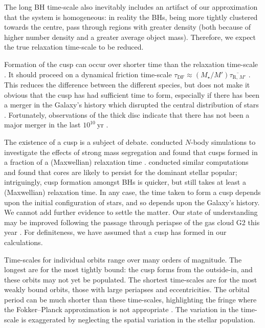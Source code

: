 \documentclass[useAMS,usedcolumn,usegraphicx,usenatbib]{mn2e}
\newcommand{\units}[1]{\ensuremath{~\mathrm{#1}}}
\newcommand{\sub}[1]{\ensuremath{_\mathrm{#1}}}
\begin{document}
\begin{onecolumn}
The long BH time-scale also inevitably includes an artifact of our approximation that the system is homogeneous: in reality the BHs, being more tightly clustered towards the centre, pass through regions with greater density (both because of higher number density and a greater average object mass). Therefore, we expect the true relaxation time-scale to be reduced. 

Formation of the cusp can occur over shorter time than the relaxation time-scale \citep{Bar-Or2012}. It should proceed on a dynamical friction time-scale $\tau\sub{DF} \approx (M_\star/M')\overline{\tau_{\mathrm{R},\,M'}}$ \citep[section 3.4]{Spitzer1987}. This reduces the difference between the different species, but does not make it obvious that the cusp has had sufficient time to form, especially if there has been a merger in the Galaxy's history which disrupted the central distribution of stars \citep{Gualandris2012}. Fortunately, observations of the thick disc indicate that there has not been a major merger in the last $10^{10}\units{yr}$ \citep{Wyse2008}.

The existence of a cusp is a subject of debate. \citet{Preto2010} conducted $N$-body simulations to investigate the effects of strong mass segregation \citep{Alexander2009, Keshet2009} and found that cusps formed in a fraction of a (Maxwellian) relaxation time \citep{Amaro-Seoane2011}. \citet{Gualandris2012} conducted similar computations and found that cores are likely to persist for the dominant stellar popular; intriguingly, cusp formation amongst BHs is quicker, but still takes at least a (Maxwellian) relaxation time. In any case, the time taken to form a cusp depends upon the initial configuration of stars, and so depends upon the Galaxy's history. We cannot add further evidence to settle the matter. Our state of understanding may be improved following the passage through periapse of the gas cloud G2 this year \citep{Bartos2013}. For definiteness, we have assumed that a cusp has formed in our calculations.

Time-scales for individual orbits range over many orders of magnitude. The longest are for the most tightly bound: the cusp forms from the outside-in, and these orbits may not yet be populated. The shortest time-scales are for the most weakly bound orbits, those with large periapses and eccentricities. The orbital period can be much shorter than these time-scales, highlighting the fringe where the Fokker--Planck approximation is not appropriate \citep{Spitzer1972}. The variation in the time-scale is exaggerated by neglecting the spatial variation in the stellar population.


\end{onecolumn}
\end{document}
